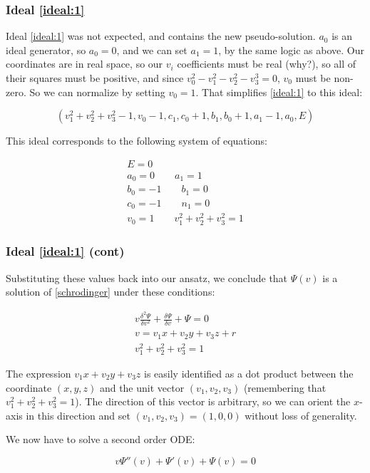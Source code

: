 \documentclass{beamer}
\begin{document}
\begin{frame}
\frametitle{Ideal \eqref{ideal:1}}
Ideal \eqref{ideal:1} was not expected, and contains the new pseudo-solution.
$a_0$ is an ideal generator,
so $a_0=0$, and we can set $a_1=1$, by the same logic as above.
Our coordinates are in real space, so our $v_i$ coefficients must be real (why?), so all of their squares must
be positive, and since $v_0^2-v_1^2-v_2^2-v_3^3=0$, $v_0$ must be non-zero.  So we can normalize by setting $v_0=1$.
That simplifies \eqref{ideal:1} to this ideal:

\begin{equation}
\left(v_{1}^{2} + v_{2}^{2} + v_{3}^{2} - 1, v_{0} - 1, c_{1}, c_{0} + 1, b_{1}, b_{0} + 1, a_{1} - 1, a_{0}, E\right)
\end{equation}

This ideal corresponds to the following system of equations:

\begin{equation}
\begin{gathered}
E = 0 \\
a_0 = 0 \qquad
a_1 = 1 \\
b_0 = -1 \qquad
b_1 = 0 \\
c_0 = -1 \qquad
n_1 = 0 \\
v_0 = 1 \qquad
v_1^2 + v_2^2 + v_3^2 = 1
\end{gathered}
\end{equation}

\end{frame}

\begin{frame}
\frametitle{Ideal \eqref{ideal:1} (cont)}

Substituting these values back into our ansatz, we conclude that $\Psi(v)$
is a solution of \eqref{schrodinger} under these conditions:

\begin{equation}
\label{related solution}
\begin{gathered}
v \frac{\delta^2\Psi}{\delta v^2} + \frac{\delta\Psi}{\delta v} + \Psi = 0 \\
v = v_1 x+ v_2 y+ v_3 z+r \\
v_1^2 + v_2^2 + v_3^2 = 1
\end{gathered}
\end{equation}

The expression $v_1 x + v_2 y + v_3 z$ is easily identified as a dot product between
the coordinate $(x,y,z)$ and the unit vector $(v_1, v_2, v_3)$ (remembering
that $v_1^2 + v_2^2 + v_3^2 = 1$).  The direction of this vector is arbitrary,
so we can orient the $x$-axis in this direction and set $(v_1, v_2, v_3) = (1,0,0)$
without loss of generality.

We now have to solve a second order ODE:

\begin{equation}
v \Psi''(v) + \Psi'(v) + \Psi(v) = 0
\end{equation}

\end{frame}
\end{document}
